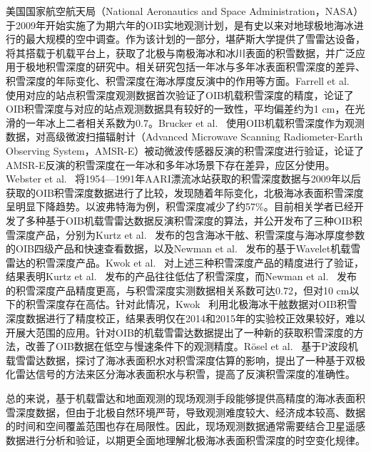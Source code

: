 美国国家航空航天局（National Aeronautics and Space Administration，NASA）于2009年开始实施了为期六年的OIB实地观测计划，是有史以来对地球极地海冰进行的最大规模的空中调查。作为该计划的一部分，堪萨斯大学提供了雪雷达设备，将其搭载于机载平台上，获取了北极与南极海冰和冰川表面的积雪数据，并广泛应用于极地积雪深度的研究中。相关研究包括一年冰与多年冰表面积雪深度的差异、积雪深度的年际变化、积雪深度在海冰厚度反演中的作用等方面。Farrell et al.~\cite{farrell2012} 使用对应的站点积雪深度观测数据首次验证了OIB机载积雪深度的精度，论证了OIB积雪深度与对应的站点观测数据具有较好的一致性，平均偏差约为1 cm，在光滑的一年冰上二者相关系数为0.7。Brucker et al.~\cite{brucker2013} 使用OIB机载积雪深度作为观测数据，对高级微波扫描辐射计（Advanced Microwave Scanning Radiometer-Earth Observing System，AMSR-E）被动微波传感器反演的积雪深度进行验证，论证了AMSR-E反演的积雪深度在一年冰和多年冰场景下存在差异，应区分使用。Webster et al.~\cite{webster2014} 将1954—1991年AARI漂流冰站获取的积雪深度数据与2009年以后获取的OIB积雪深度数据进行了比较，发现随着年际变化，北极海冰表面积雪深度呈明显下降趋势。以波弗特海为例，积雪深度减少了约57\%。目前相关学者已经开发了多种基于OIB机载雪雷达数据反演积雪深度的算法，并公开发布了三种OIB积雪深度产品，分别为Kurtz et al.~\cite{kurtz2013} 发布的包含海冰干舷、积雪深度与海冰厚度参数的OIB四级产品和快速查看数据，以及Newman et al.~\cite{newman2014} 发布的基于Wavelet机载雪雷达的积雪深度产品。Kwok et al.~\cite{kwok_kurtz2017} 对上述三种积雪深度产品的精度进行了验证，结果表明Kurtz et al.~\cite{kurtz2013} 发布的产品往往低估了积雪深度，而Newman et al.~\cite{newman2014} 发布的积雪深度产品精度更高，与积雪深度实测数据相关系数可达0.72，但对10 cm以下的积雪深度存在高估。针对此情况，Kwok~\cite{kwok2018} 利用北极海冰干舷数据对OIB积雪深度数据进行了精度校正，结果表明仅在2014和2015年的实验校正效果较好，难以开展大范围的应用。针对OIB的机载雪雷达数据提出了一种新的获取积雪深度的方法，改善了OIB数据在低空与慢速条件下的观测精度。Rösel et al.~\cite{roesel2021} 基于P波段机载雪雷达数据，探讨了海冰表面积水对积雪深度估算的影响，提出了一种基于双极化雷达信号的方法来区分海冰表面积水与积雪，提高了反演积雪深度的准确性。

总的来说，基于机载雷达和地面观测的现场观测手段能够提供高精度的海冰表面积雪深度数据，但由于北极自然环境严苛，导致观测难度较大、经济成本较高、数据的时间和空间覆盖范围也存在局限性。因此，现场观测数据通常需要结合卫星遥感数据进行分析和验证，以期更全面地理解北极海冰表面积雪深度的时空变化规律。

